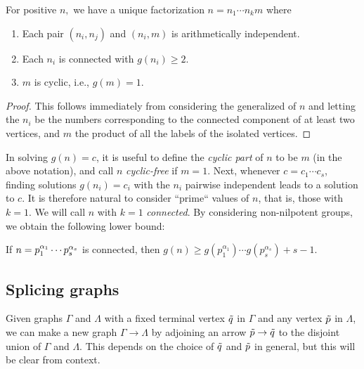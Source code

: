 \begin{prop}
	For positive $n,$ we have a unique factorization $n = n_1 \cdots n_k m$ where\pagebreak[3]
	\begin{enumerate} \listspace
		\item Each pair $(n_i, n_j)$ and $(n_i, m)$ is arithmetically independent.
		\item Each $n_i$ is connected with $g(n_i) \ge 2.$
		\item $m$ is cyclic, i.e., $g(m) = 1.$
	\end{enumerate} \textspace
\end{prop}
\begin{proof}
	This follows immediately from considering the generalized  of $n$ and letting the $n_i$ be the numbers corresponding to the connected component of at least two vertices, and $m$ the product of all the labels of the isolated vertices.
\end{proof}

In solving $g(n) = c$, it is useful to define the \emph{cyclic part} of $n$ to be $m$ (in the above notation), and call $n$ \emph{cyclic-free} if $m = 1$. Next, whenever $c = c_1 \cdots c_s$, finding solutions $g(n_i) = c_i$ with the $n_i$ pairwise independent leads to a solution to $c$. It is therefore natural to consider ``prime`` values of $n$, that is, those with $k = 1$. We will call $n$ with $k = 1$ \emph{connected}. By considering non-nilpotent groups, we obtain the following lower bound:

\begin{prop}
	If $n = p_1^{\alpha_1} \cdots p_s^{\alpha_s}$ is connected, then $g(n) \ge g(p_1^{\alpha_1})\cdots g(p_s^{\alpha_s}) + s - 1.$
\end{prop}

\subsection{Splicing graphs}
Given graphs $\Gamma$ and $\Lambda$ with a fixed terminal vertex $\tilde{q}$ in $\Gamma$ and any vertex $\tilde{p}$ in $\Lambda$, we can make a new graph $\Gamma \rightarrow \Lambda$ by adjoining an arrow $\tilde{p} \rightarrow \tilde{q}$ to the disjoint union of $\Gamma$ and $\Lambda$. This depends on the choice of $\tilde{q}$ and $\tilde{p}$ in general, but this will be clear from context. 

